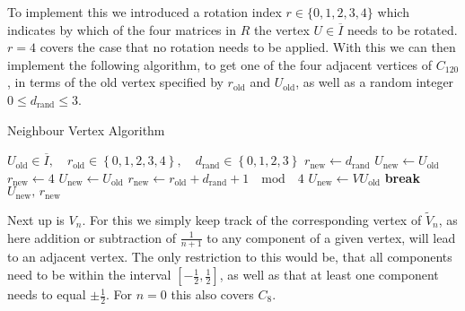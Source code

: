 To implement this we introduced a rotation index $r \in \{0,1,2,3,4\}$ which indicates by which of the four matrices in $R$ the vertex $U \in \overline{I}$ needs to be rotated. $r=4$ covers the case that no rotation needs to be applied. With this we can then implement the following algorithm, to get one of the four adjacent vertices of $C_{120}$, in terms of the old vertex specified by $r_{\textrm{old}}$ and $U_{\textrm{old}}$, as well as a random integer $0 \le d_{\textrm{rand}} \le 3$.
\begin{algorithm}[!htb]
 \caption{Neighbour Vertex Algorithm}
 \label{alg:120CellVertexPick}
 \begin{algorithmic}[1]
  \REQUIRE $U_{\textrm{old}} \in \overline{I}, \quad r_{\textrm{old}}\in \left\{ 0,1,2,3,4\right\}, \quad d_{\textrm{rand}} \in \left\{0,1,2,3 \right\}$
  \STATE $r_{\textrm{new}} \leftarrow d_{\textrm{rand}}$
  \STATE $U_{\textrm{new}} \leftarrow U_{\textrm{old}}$
  \STATE $r_{\textrm{new}} \leftarrow 4$
  \STATE $U_{\textrm{new}} \leftarrow U_{\textrm{old}}$
  \ELSE
  \STATE $r_{\textrm{new}} \leftarrow r_{\textrm{old}} + d_{\textrm{rand}} + 1 \quad \mathrm{mod} \quad 4$
  \STATE $U_{\textrm{new}} \leftarrow V U_{\textrm{old}}$
  \STATE \textbf{break}
  \ENDIF
  \ENDFOR
  \ENDIF
  \RETURN $U_{\textrm{new}}, \, r_{\textrm{new}}$
 \end{algorithmic}
\end{algorithm}

Next up is $V_n$. For this we simply keep track of the corresponding vertex of $\tilde{V}_n$, as here addition or subtraction of $\frac{1}{n+1}$ to any component of a given vertex, will lead to an adjacent vertex. The only restriction to this would be, that all components need to be within the interval $\left[-\frac{1}{2},\frac{1}{2}\right]$, as well as that at least one component needs to equal $\pm \frac{1}{2}$. For $n = 0$ this also covers $C_8$.\\

